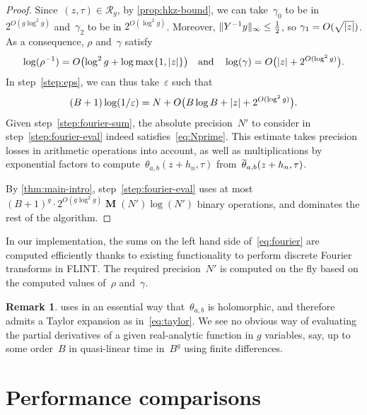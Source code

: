 \documentclass[12pt,oneside]{amsart}
\numberwithin{equation}{section}
\theoremstyle{definition}
\newtheorem{rem}[equation]{Remark}
\newcommand{\red}{\mathcal{R}}
\newcommand{\eps}{\varepsilon}
\DeclareMathOperator{\thetatilde}{\rlap{\raisebox{-0.1ex}{$\widetilde{\phantom{\,t}}$}}\theta}
\DeclareMathOperator{\Mul}{\mathbf{M}}
\DeclarePairedDelimiter{\abs}{|}{|}
\DeclarePairedDelimiter{\paren}{(}{)}
\DeclarePairedDelimiter{\norm}{\|}{\|}
\begin{document}
\begin{proof}
  Since~$(z,\tau)\in \red_g$, by \cref{prop:hkz-bound}, we can take~$\gamma_0$
  to be in~$2^{O(g\log^2 g)}$ and~$\gamma_2$ to be in $2^{O(\log^2
    g)}$. Moreover, $\norm{Y^{-1}y}_\infty\leq \tfrac 12$, so
  $\gamma_1 = O(\sqrt{\abs{z}})$. As a consequence, $\rho$ and~$\gamma$ satisfy
  \begin{displaymath}
    \log(\rho^{-1}) = O\paren[\big]{\log^2 g + \log\max\{1,\abs{z}\}} \quad \text{and}\quad  \log(\gamma) = O\paren[\big]{\abs{z} +  2^{O(\log^2 g)}}.
  \end{displaymath}
  In step~\eqref{step:eps}, we can thus take~$\eps$ such that
  \begin{displaymath}
    (B+1)\log(1/\eps) = N + O\paren[\big]{B\log B + \abs{z} + 2^{O(\log^2 g)}}.
  \end{displaymath}
  Given step~\eqref{step:fourier-sum}, the absolute precision~$N'$ to consider
  in step~\eqref{step:fourier-eval} indeed satisfies~\eqref{eq:Nprime}. This
  estimate takes precision losses in arithmetic operations into account, as
  well as multiplications by exponential factors to
  compute~$\theta_{a,b}(z+h_n,\tau)$ from~$\thetatilde_{a,b}(z+h_n,\tau)$.


  By \cref{thm:main-intro}, step~\eqref{step:fourier-eval} uses at most
  $(B+1)^g \cdot 2^{O(g\log^2 g)} \Mul(N')\log(N')$ binary operations, and
  dominates the rest of the algorithm.
\end{proof}

In our implementation, the sums on the left hand side of~\eqref{eq:fourier} are
computed efficiently thanks to existing functionality to perform discrete
Fourier transforms in FLINT. The required precision~$N'$ is computed on the fly
based on the computed values of~$\rho$ and~$\gamma$.

\begin{rem}
   uses in an essential way that~$\theta_{a,b}$ is
  holomorphic, and therefore admits a Taylor expansion as
  in~\eqref{eq:taylor}. We see no obvious way of evaluating the partial
  derivatives of a given real-analytic function in $g$ variables, say, up to
  some order~$B$ in quasi-linear time in~$B^g$ using finite differences.
\end{rem}


\section{Performance comparisons}
\label{sec:cmp}
\end{document}
